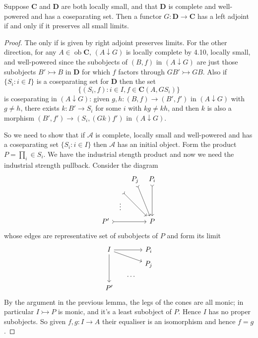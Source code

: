 \documentclass[a4paper]{article}
\renewcommand{\c}[1]{\mathbf{#1}}
\DeclareMathOperator{\ob}{ob}
\newcommand{\mono}{\rightarrowtail}
\begin{document}
\begin{theorem}
  Suppose \(\c C\) and \(\c D\) are both locally small, and that \(\c D\) is complete and well-powered and has a coseparating set. Then a functor \(G: \c D \to \c C\) has a left adjoint if and only if it preserves all small limits.
\end{theorem}

\begin{proof}
  The only if is given by right adjoint preserves limits. For the other direction, for any \(A \in \ob \c C\), \((A \downarrow G)\) is locally complete by 4.10, locally small, and well-powered since the subobjects of \((B, f)\) in \((A \downarrow G)\) are just those subobjects \(B' \mono B\) in \(\c D\) for which \(f\) factors through \(GB' \mono GB\). Also if \(\{S_i: i \in I\}\) is a coseparating set for \(\c D\) then the set
  \[
    \{(S_i, f): i \in I, f \in \c C(A, GS_i)\}
  \]
  is coseparating in \((A \downarrow G)\): given \(g, h: (B, f) \to (B', f')\) in \((A \downarrow G)\) with \(g \neq h\), there exists \(k: B' \to S_i\) for some \(i\) with \(kg \neq kh\), and then \(k\) is also a morphism \((B', f') \to (S_i, (Gk) f')\) in \((A \downarrow G)\).

  So we need to show that if \(\mathcal A\) is complete, locally small and well-powered and has a coseparating set \(\{S_i: i \in I\}\) then \(\mathcal A\) has an initial object. Form the product \(P = \prod_i \in S_i\). We have the industrial stength product and now we need the industrial strength pullback. Consider the diagram
  \[
    \begin{tikzcd}[row sep=tiny, column sep=tiny]
      & & P_j \ar[dddr, tail] & P_i \ar[ddd, tail] \\
      & \ar[ddrr, tail] \\
      & \vdots \\
      P' \ar[rrr, tail] & & & P
    \end{tikzcd}
  \]
  whose edges are representative set of subobjects of \(P\) and form its limit
  \[
    \begin{tikzcd}[row sep=tiny, column sep=tiny]
      I \ar[rrr] \ar[rrrd] \ar[ddd] & & & P_i \\
      & & & P_j \\
      & & \dots \\
      P'
    \end{tikzcd}
  \]
  By the argument in the previous lemma, the legs of the cones are all monic; in particular \(I \mono P\) is monic, and it's a least subobject of \(P\). Hence \(I\) has no proper subobjects. So given \(f, g: I \to A\) their equaliser is an isomorphism and hence \(f = g\).


\end{proof}
\end{document}
